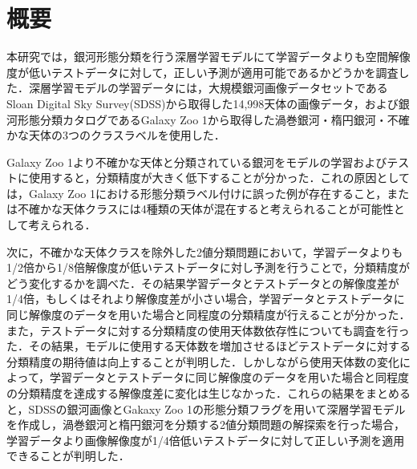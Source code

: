 \documentclass[a4j, 11pt]{jreport}
\begin{document}
\chapter*{概要}
本研究では，銀河形態分類を行う深層学習モデルにて学習データよりも空間解像度が低いテストデータに対して，正しい予測が適用可能であるかどうかを調査した．深層学習モデルの学習データには，大規模銀河画像データセットであるSloan Digital Sky Survey(SDSS)から取得した14,998天体の画像データ，および銀河形態分類カタログであるGalaxy Zoo 1から取得した渦巻銀河・楕円銀河・不確かな天体の3つのクラスラベルを使用した．

Galaxy Zoo 1より不確かな天体と分類されている銀河をモデルの学習およびテストに使用すると，分類精度が大きく低下することが分かった．これの原因としては，Galaxy Zoo 1における形態分類ラベル付けに誤った例が存在すること，または不確かな天体クラスには4種類の天体が混在すると考えられることが可能性として考えられる．

次に，不確かな天体クラスを除外した2値分類問題において，学習データよりも1/2倍から1/8倍解像度が低いテストデータに対し予測を行うことで，分類精度がどう変化するかを調べた．その結果学習データとテストデータとの解像度差が1/4倍，もしくはそれより解像度差が小さい場合，学習データとテストデータに同じ解像度のデータを用いた場合と同程度の分類精度が行えることが分かった．
また，テストデータに対する分類精度の使用天体数依存性についても調査を行った．その結果，モデルに使用する天体数を増加させるほどテストデータに対する分類精度の期待値は向上することが判明した．しかしながら使用天体数の変化によって，学習データとテストデータに同じ解像度のデータを用いた場合と同程度の分類精度を達成する解像度差に変化は生じなかった．これらの結果をまとめると，SDSSの銀河画像とGakaxy Zoo 1の形態分類フラグを用いて深層学習モデルを作成し，渦巻銀河と楕円銀河を分類する2値分類問題の解探索を行った場合，学習データより画像解像度が1/4倍低いテストデータに対して正しい予測を適用できることが判明した．



\end{document}
